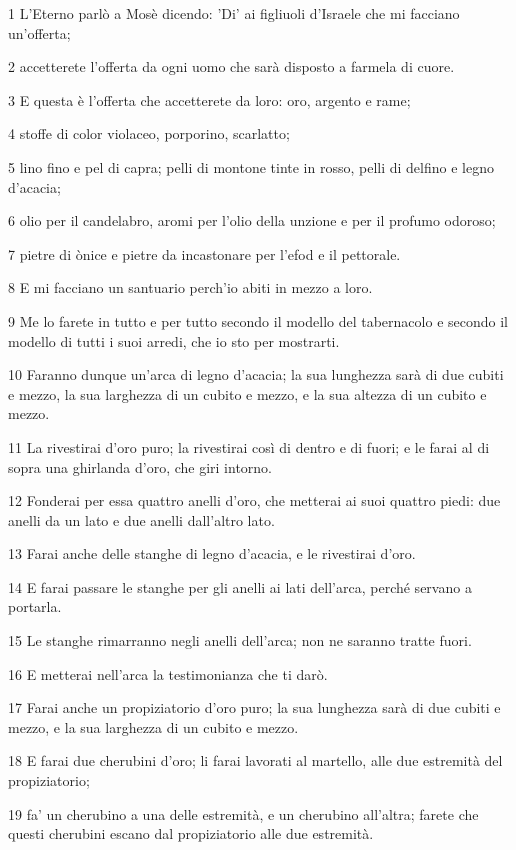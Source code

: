\par 1 L'Eterno parlò a Mosè dicendo: 'Di' ai figliuoli d'Israele che mi facciano un'offerta;
\par 2 accetterete l'offerta da ogni uomo che sarà disposto a farmela di cuore.
\par 3 E questa è l'offerta che accetterete da loro: oro, argento e rame;
\par 4 stoffe di color violaceo, porporino, scarlatto;
\par 5 lino fino e pel di capra; pelli di montone tinte in rosso, pelli di delfino e legno d'acacia;
\par 6 olio per il candelabro, aromi per l'olio della unzione e per il profumo odoroso;
\par 7 pietre di ònice e pietre da incastonare per l'efod e il pettorale.
\par 8 E mi facciano un santuario perch'io abiti in mezzo a loro.
\par 9 Me lo farete in tutto e per tutto secondo il modello del tabernacolo e secondo il modello di tutti i suoi arredi, che io sto per mostrarti.
\par 10 Faranno dunque un'arca di legno d'acacia; la sua lunghezza sarà di due cubiti e mezzo, la sua larghezza di un cubito e mezzo, e la sua altezza di un cubito e mezzo.
\par 11 La rivestirai d'oro puro; la rivestirai così di dentro e di fuori; e le farai al di sopra una ghirlanda d'oro, che giri intorno.
\par 12 Fonderai per essa quattro anelli d'oro, che metterai ai suoi quattro piedi: due anelli da un lato e due anelli dall'altro lato.
\par 13 Farai anche delle stanghe di legno d'acacia, e le rivestirai d'oro.
\par 14 E farai passare le stanghe per gli anelli ai lati dell'arca, perché servano a portarla.
\par 15 Le stanghe rimarranno negli anelli dell'arca; non ne saranno tratte fuori.
\par 16 E metterai nell'arca la testimonianza che ti darò.
\par 17 Farai anche un propiziatorio d'oro puro; la sua lunghezza sarà di due cubiti e mezzo, e la sua larghezza di un cubito e mezzo.
\par 18 E farai due cherubini d'oro; li farai lavorati al martello, alle due estremità del propiziatorio;
\par 19 fa' un cherubino a una delle estremità, e un cherubino all'altra; farete che questi cherubini escano dal propiziatorio alle due estremità.
